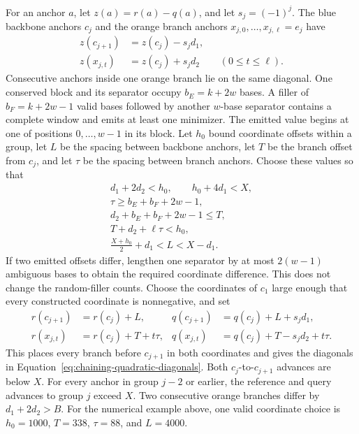 For an anchor \(a\), let \(z(a)=r(a)-q(a)\), and let \(s_j=(-1)^j\). The
blue backbone anchors \(c_j\) and the orange branch anchors
\(x_{j,0},\ldots,x_{j,\ell}=e_j\) have
\begin{equation}
\begin{aligned}
  z(c_{j+1}) &= z(c_j)-s_jd_1,\\
  z(x_{j,t}) &= z(c_j)+s_jd_2
  && (0\leq t\leq\ell).
\end{aligned}
\label{eq:chaining-quadratic-diagonals}
\end{equation}
Consecutive anchors inside one orange branch lie on the same diagonal. One
conserved block and its separator occupy \(b_E=k+2w\) bases. A filler of
\(b_F=k+2w-1\) valid bases followed by another \(w\)-base separator contains
a complete window and emits at least one minimizer. The emitted value begins at one of positions
\(0,\ldots,w-1\) in its block. Let \(h_0\) bound coordinate offsets within a
group, let \(L\) be the spacing between backbone anchors, let \(T\) be the
branch offset from \(c_j\), and let \(\tau\) be the spacing between branch
anchors. Choose these values so that
\[
\begin{gathered}
  d_1+2d_2<h_0,\qquad h_0+4d_1<X,\\
  \tau\geq b_E+b_F+2w-1,\\
  d_2+b_E+b_F+2w-1\leq T,\\
  T+d_2+\ell\tau<h_0,\\
  \frac{X+h_0}{2}+d_1<L<X-d_1.
\end{gathered}
\]
If two emitted offsets differ, lengthen one separator by at most \(2(w-1)\)
ambiguous bases to obtain the required coordinate difference. This does not
change the random-filler counts.
Choose the coordinates of \(c_1\) large enough that every constructed
coordinate is nonnegative, and set
\begin{equation}
\begin{aligned}
  r(c_{j+1}) &= r(c_j)+L,&
  q(c_{j+1}) &= q(c_j)+L+s_jd_1,\\
  r(x_{j,t}) &= r(c_j)+T+t\tau,&
  q(x_{j,t}) &= q(c_j)+T-s_jd_2+t\tau.
\end{aligned}
\label{eq:chaining-quadratic-coordinate-witness}
\end{equation}
This places every branch before \(c_{j+1}\) in both coordinates and gives the
diagonals in Equation~\ref{eq:chaining-quadratic-diagonals}. Both
\(c_j\)-to-\(c_{j+1}\) advances are below \(X\). For every anchor in group
\(j-2\) or earlier, the reference and query advances to group \(j\) exceed
\(X\). Two consecutive orange branches differ by \(d_1+2d_2>B\). For the
numerical example above, one valid coordinate choice is \(h_0=1000\),
\(T=338\), \(\tau=88\), and \(L=4000\).

